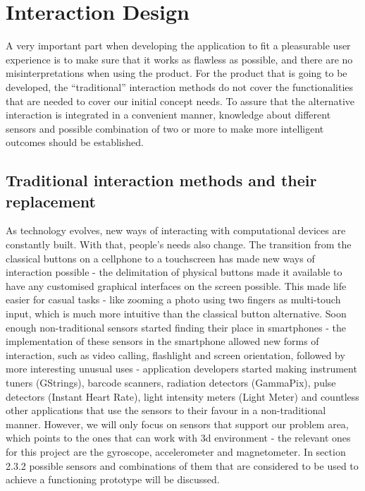 \section{Interaction Design}
A very important part when developing the application to fit a pleasurable user experience is to make sure that it works as flawless as possible, and there are no misinterpretations when using the product. For the product that is going to be developed, the “traditional” interaction methods do not cover the functionalities that are needed to cover our initial concept needs. To assure that the alternative interaction is integrated in a convenient manner, knowledge about different sensors and possible combination of two or more to make more intelligent outcomes should be established.
\subsection{Traditional interaction methods and their replacement}
As technology evolves, new ways of interacting with computational devices are constantly built. With that, people’s needs also change. The transition from the classical buttons on a cellphone to a touchscreen has made new ways of interaction possible - the delimitation of physical buttons made it available to have any customised graphical interfaces on the screen possible. This made life easier for casual tasks - like zooming a photo using two fingers as multi-touch input, which is much more intuitive than the classical button alternative.
Soon enough non-traditional sensors started finding their place in smartphones - the implementation of these sensors in the smartphone allowed new forms of interaction, such as video calling, flashlight and screen orientation, followed by more interesting unusual uses - application developers started making instrument tuners (GStrings), barcode scanners, radiation detectors (GammaPix), pulse detectors (Instant Heart Rate), light intensity meters (Light Meter) and countless other applications that use the sensors to their favour in a non-traditional manner. However, we will only focus on sensors that support our problem area, which points to the ones that can work with 3d environment - the relevant ones for this project are the gyroscope, accelerometer and magnetometer. In section 2.3.2  possible sensors and combinations of them that are considered to be used to achieve a functioning prototype will be discussed. %


